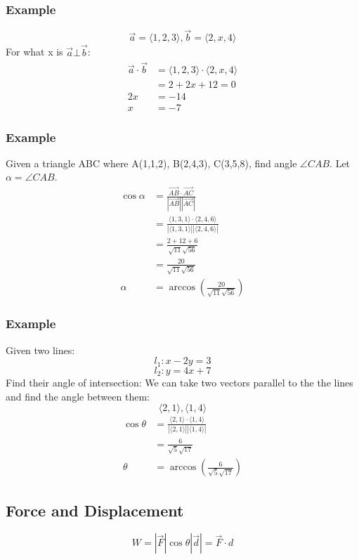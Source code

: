 \documentclass{math}
\begin{document}
\subsubsection*{Example}
\[ \vec{a} = \langle1,2,3\rangle, \vec{b} = \langle2,x,4\rangle \]
For what x is \( \vec{a}\bot\vec{b} \):
\begin{align*}
  \vec{a}\cdot\vec{b} &= \langle1,2,3\rangle\cdot\langle2,x,4\rangle \\
  &= 2+2x+12 = 0 \\
  2x &= -14 \\
  x &= -7
\end{align*}

\subsubsection*{Example}
Given a triangle ABC where A(1,1,2), B(2,4,3), C(3,5,8), find angle
\( \angle CAB \). Let \( \alpha = \angle CAB \).
\begin{align*}
  \cos\alpha &= \frac{\overrightarrow{AB}\cdot\overrightarrow{AC}}
  {|\overrightarrow{AB}||\overrightarrow{AC}|} \\
  &= \frac{\langle1,3,1\rangle\cdot\langle2,4,6\rangle}
    {|\langle1,3,1\rangle||\langle2,4,6\rangle|} \\
  &= \frac{2+12+6}{\sqrt{11}\sqrt{56}} \\
  &= \frac{20}{\sqrt{11}\sqrt{56}} \\
  \alpha &= \arccos(\frac{20}{\sqrt{11}\sqrt{56}})
\end{align*}

\subsubsection*{Example}
Given two lines:
\[ l_{1}: x-2y = 3 \]
\[ l_{2}: y = 4x+7 \]
Find their angle of intersection:
We can take two vectors parallel to the the lines and find the angle between
them:
\[ \langle2,1\rangle, \langle1,4\rangle \]
\begin{align*}
  \cos\theta &= \frac{\langle2,1\rangle\cdot\langle1,4\rangle}
    {|\langle2,1\rangle||\langle1,4\rangle|} \\
  &= \frac{6}{\sqrt{5}\sqrt{17}} \\
  \theta &= \arccos(\frac{6}{\sqrt{5}\sqrt{17}})
\end{align*}

\subsection*{Force and Displacement}
\begin{center}
\end{center}
\[ W = |\vec{F}|\cos\theta|\vec{d}| = \vec{F}\cdot{d} \]
\end{document}
